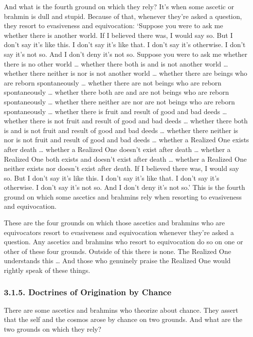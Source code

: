 \documentclass[12pt,openany]{book}%
\begin{document}
And what is the fourth ground on which they rely? It’s when some ascetic or brahmin is dull and stupid. Because of that, whenever they’re asked a question, they resort to evasiveness and equivocation: ‘Suppose you were to ask me whether there is another world. If I believed there was, I would say so. But I don’t say it’s like this. I don’t say it’s like that. I don’t say it’s otherwise. I don’t say it’s not so. And I don’t deny it’s not so. Suppose you were to ask me whether there is no other world … whether there both is and is not another world … whether there neither is nor is not another world … whether there are beings who are reborn spontaneously … whether there are not beings who are reborn spontaneously … whether there both are and are not beings who are reborn spontaneously … whether there neither are nor are not beings who are reborn spontaneously … whether there is fruit and result of good and bad deeds … whether there is not fruit and result of good and bad deeds … whether there both is and is not fruit and result of good and bad deeds … whether there neither is nor is not fruit and result of good and bad deeds … whether a Realized One exists after death … whether a Realized One doesn’t exist after death … whether a Realized One both exists and doesn’t exist after death … whether a Realized One neither exists nor doesn’t exist after death. If I believed there was, I would say so. But I don’t say it’s like this. I don’t say it’s like that. I don’t say it’s otherwise. I don’t say it’s not so. And I don’t deny it’s not so.’ This is the fourth ground on which some ascetics and brahmins rely when resorting to evasiveness and equivocation. 

These are the four grounds on which those ascetics and brahmins who are equivocators resort to evasiveness and equivocation whenever they’re asked a question. Any ascetics and brahmins who resort to equivocation do so on one or other of these four grounds. Outside of this there is none. The Realized One understands this … And those who genuinely praise the Realized One would rightly speak of these things. 

\subsubsection*{3.1.5. Doctrines of Origination by Chance }

There are some ascetics and brahmins who theorize about chance. They assert that the self and the cosmos arose by chance on two grounds. And what are the two grounds on which they rely? 
\end{document}
